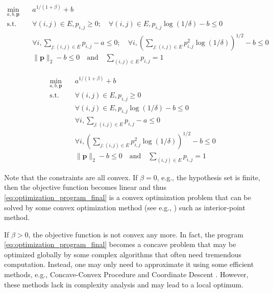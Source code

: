 \documentclass[letterpaper]{article} %
\def\DoubleColumn{}
\def\DoubleColumnEnd{}
\def\SingleColumn{}
\def\SingleColumnEnd{}
\newcommand{\probdistri}{\mathbf{p}}
\newcommand{\pair}[1]{(#1)}
\newcommand{\complexbound}{\beta}
\begin{document}
\SingleColumn
\begin{equation}
    \label{eq:optimization_program_final}
\begin{aligned}
    \min_{a,b,\probdistri{}} \quad&
    a^{1/(1+\complexbound{})}+b\\
    \mbox{s.t.} \quad &\forall \pair{i,j}\in E, p_{i,j}\ge 0; \quad \forall \pair{i,j}\in E, p_{i,j}\log(1/\delta) - b \le 0\\
    & \forall i, \sum_{j:\pair{i,j}\in E} p_{i,j} -a  \le 0; \quad \forall i, \left(\sum_{j:\pair{i,j}\in E} p^2_{i,j}\log(1/\delta)\right)^{1/2} -b  \le 0\\
    & \|\probdistri{}\|_2 -b \le 0 \quad \mbox{and} \quad \sum_{\pair{i,j}\in E} p_{i,j}= 1
\end{aligned}
\end{equation}
\SingleColumnEnd
\DoubleColumn
\begin{equation}
    \label{eq:optimization_program_final}
\begin{aligned}
    \min_{a,b,\probdistri{}} \quad&
    a^{1/(1+\complexbound{})}+b\\
    \mbox{s.t.} \quad &\forall \pair{i,j}\in E, p_{i,j}\ge 0 \\
    & \forall \pair{i,j}\in E, p_{i,j}\log(1/\delta) - b \le 0\\
    & \forall i, \sum_{j:\pair{i,j}\in E} p_{i,j} -a  \le 0\\
    & \forall i, \left(\sum_{j:\pair{i,j}\in E} p^2_{i,j}\log(1/\delta)\right)^{1/2} -b  \le 0\\
    & \|\probdistri{}\|_2 -b \le 0 \quad \mbox{and} \quad \sum_{\pair{i,j}\in E} p_{i,j}= 1
\end{aligned}
\end{equation}
\DoubleColumnEnd
Note that the constraints are all convex. 
If $\complexbound{}=0$, e.g., the hypothesis set is finite, then the objective function becomes linear and thus \eqref{eq:optimization_program_final} is a convex optimization problem that can be solved by some convex optimization method (see e.g., \cite{boyd2004convex}) such as interior-point method. 

If $\complexbound{}>0$, the objective function is not convex any more. In fact, the program \eqref{eq:optimization_program_final} becomes a concave problem that may be optimized globally by some complex algorithms \cite{benson1995concave,hoffman1981method} that often need tremendous computation. 
Instead, one may only need to approximate it using some efficient methods, e.g., Concave-Convex Procedure \cite{Yuille2001The} and Coordinate Descent \cite{wright2015coordinate}. 
However, these methods lack in complexity analysis and may lead to a local optimum. 
\end{document}
